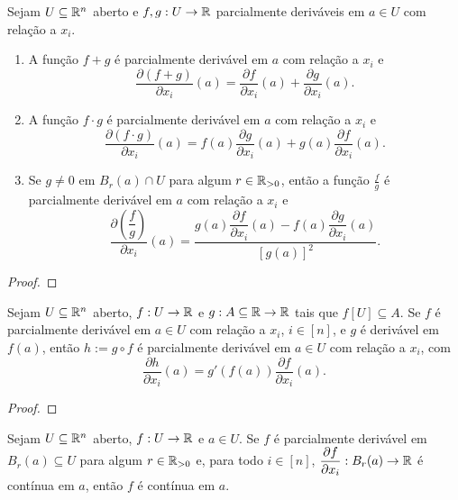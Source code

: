 \begin{proposition}
    Sejam $U \subseteq \mathbb{R}^n$ aberto e $f,g : U \to \mathbb{R}$ parcialmente deriváveis em $a \in U$ com relação a $x_i$.
        \begin{enumerate}[leftmargin=*, align=left, label=\textbf{(\alph*)}]
            \item A função $f + g$ é parcialmente derivável em $a$ com relação a $x_i$ e
                \[
                    \dfrac{\partial (f+g)}{\partial x_i} (a) = \dfrac{\partial f}{\partial x_i} (a) + \dfrac{\partial g}{\partial x_i} (a).
                \]
            \item A função $f \cdot g$ é parcialmente derivável em $a$ com relação a $x_i$ e
                \[
                    \dfrac{\partial (f \cdot g)}{\partial x_i} (a) = f(a) \dfrac{\partial g}{\partial x_i} (a) + g(a) \dfrac{\partial f}{\partial x_i} (a).
                \]
            \item Se $g \neq 0$ em $B_r(a) \cap U$ para algum $r \in \mathbb{R}_{>0}$, então a função $\frac{f}{g}$ é parcialmente derivável em $a$ com relação a $x_i$ e
                \[
                    \dfrac{\partial \left(\dfrac{f}{g} \right)}{\partial x_i} (a) = \dfrac{g(a) \dfrac{\partial f}{\partial x_i} (a) - f(a) \dfrac{\partial g}{\partial x_i} (a)}{[g(a)]^2}.
                \]
        \end{enumerate}
\end{proposition}

\begin{proof}
    \blackproof
\end{proof}

\begin{proposition}
    Sejam $U \subseteq \mathbb{R}^n$ aberto, $f : U \to \mathbb{R}$ e $g : A \subseteq \mathbb{R} \to \mathbb{R}$ tais que $f[U] \subseteq A$. Se $f$ é parcialmente derivável em $a \in U$ com relação a $x_i$, $i \in [n]$, e $g$ é derivável em $f(a)$, então $h := g \circ f$ é parcialmente derivável em $a \in U$ com relação a $x_i$, com
        \[
            \dfrac{\partial h}{\partial x_i}(a) = g'(f(a)) \dfrac{\partial f}{\partial x_i}(a).
        \]
\end{proposition}

\begin{proof}
    \blackproof
\end{proof}

\begin{theorem} \label{teo.calc2:continuidade_parciais_implica_continuidade}
    Sejam $U \subseteq \mathbb{R}^n$ aberto, $f : U \to \mathbb{R}$ e $a \in U$. Se $f$ é parcialmente derivável em $B_r(a) \subseteq U$ para algum $r \in \mathbb{R}_{>0}$ e, para todo $i \in [n]$, $\dfrac{\partial f}{\partial x_i} : B_r(a) \to \mathbb{R}$ é contínua em $a$, então $f$ é contínua em $a$.
\end{theorem}

